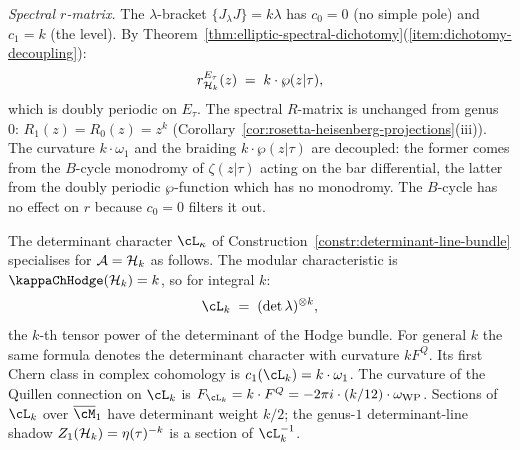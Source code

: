 \begin{computation}
\smallskip
\noindent
\emph{Spectral $r$-matrix.}
The $\lambda$-bracket $\{J_\lambda J\} = k\lambda$
has $c_0 = 0$ (no simple pole) and $c_1 = k$ (the
level). By
Theorem~\ref{thm:elliptic-spectral-dichotomy}(\ref{item:dichotomy-decoupling}):
\begin{equation}\label{eq:heisenberg-genus1-rmatrix}
r^{E_\tau}_{\mathcal{H}_k}(z)
\;=\;
k \cdot \wp(z|\tau),
\end{equation}
which is doubly periodic on $E_\tau$. The spectral
$R$-matrix is unchanged from genus~$0$:
$R_1(z) = R_0(z) = z^k$
(Corollary~\ref{cor:rosetta-heisenberg-projections}(iii)).
The curvature $k \cdot \omega_1$ and the braiding
$k \cdot \wp(z|\tau)$ are decoupled: the former comes
from the $B$-cycle monodromy of $\zeta(z|\tau)$
acting on the bar differential, the latter from the
doubly periodic $\wp$-function which has no monodromy.
The $B$-cycle has no effect on $r$ because $c_0 = 0$
filters it out.
\end{computation}

\begin{computation}
\label{comp:heisenberg-line-bundle}
The determinant character $\cL_\kappa$ of Construction~\ref{constr:determinant-line-bundle} specialises for $\mathcal{A} = \mathcal{H}_k$ as follows. The modular characteristic is $\kappaChHodge(\cH_k) = k$, so for integral $k$:
\[
\cL_k \;=\; (\det \lambda)^{\otimes k},
\]
the $k$-th tensor power of the determinant of the Hodge bundle. For
general $k$ the same formula denotes the determinant character with
curvature $kF^Q$. Its first Chern class in complex cohomology is
$c_1(\cL_k) = k \cdot \omega_1$. The curvature of the Quillen
connection on $\cL_k$ is
$F_{\cL_k} = k \cdot F^Q = -2\pi i \cdot (k/12) \cdot \omega_{\mathrm{WP}}$.
Sections of $\cL_k$ over $\overline{\cM}_1$ have determinant weight
$k/2$; the genus-$1$ determinant-line shadow
$Z_1(\mathcal{H}_k) = \eta(\tau)^{-k}$ is a section of $\cL_k^{-1}$.
\end{computation}

